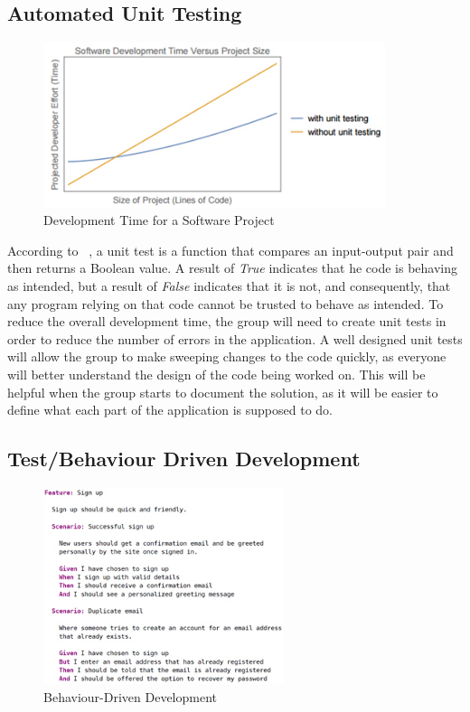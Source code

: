 \subsection{Automated Unit Testing}

\begin{figure}
  \centering
  \begin{minipage}{7cm}
    \centering
    \includegraphics[width=10cm]{inc/automated_unit_testing.jpg}
    \caption{Development Time for a Software Project}
    \label{fig:automated_unit_testing}
  \end{minipage}
\end{figure}

According to ~\textcite{rep:unit_testing_validation}, a unit test is a function that compares an input-output pair and then returns a Boolean value. A result of \textit{True} indicates that he code is behaving as intended, but a result of \textit{False} indicates that it is not, and consequently, that any program relying on that code cannot be trusted to behave as intended. To reduce the overall development time, the group will need to create unit tests in order to reduce the number of errors in the application. A well designed unit tests will allow the group to make sweeping changes to the code quickly, as everyone will better understand the design of the code being worked on. This will be helpful when the group starts to document the solution, as it will be easier to define what each part of the application is supposed to do.

\subsection{Test/Behaviour Driven Development}

\begin{figure}
  \centering
  \begin{minipage}{7cm}
    \centering
    \includegraphics[width=7cm]{inc/behaviour_driven_development.jpg}
    \caption{Behaviour-Driven Development}
    \label{fig:behaviour_driven_development}
  \end{minipage}
\end{figure}

